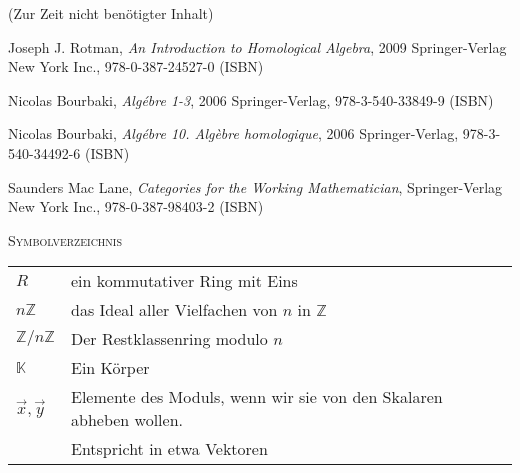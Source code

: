 \documentclass[a4paper]{amsart}
\theoremstyle{definition}
\newcommand{\Z}{\ensuremath{\mathbb{ Z }}}
\newcommand{\K}{\ensuremath{\mathbb{ K }}}
\newcommand{\zz}[1]{\ensuremath{\Z /#1\Z}}
\begin{document}
\begin{backup}
    (Zur Zeit nicht benötigter Inhalt)
\end{backup}

\begin{thebibliography}{9}
   	Joseph J. Rotman, \emph{An Introduction to Homological Algebra},
   	2009 Springer-Verlag New York Inc., 978-0-387-24527-0 (ISBN)

      Nicolas Bourbaki, \emph{Algébre 1-3},
      2006 Springer-Verlag, 978-3-540-33849-9 (ISBN)

      Nicolas Bourbaki, \emph{Algébre 10. Algèbre homologique},
      2006 Springer-Verlag, 978-3-540-34492-6 (ISBN)

      Saunders Mac Lane, \emph{Categories for the Working Mathematician},
      Springer-Verlag New York Inc., 978-0-387-98403-2 (ISBN)

\end{thebibliography}

\begin{large}
    \centerline{\textsc{Symbolverzeichnis}}
\end{large}
\bigskip

\renewcommand*{\arraystretch}{1}

\begin{tabular}{ll}
    $R$                                 & ein kommutativer Ring mit Eins\\
    $n\Z$                               & das Ideal aller Vielfachen von $n$ in $\Z$\\
    $\zz{n}$                            & Der Restklassenring modulo $n$\\
    $\K$                                & Ein Körper\\
    $\vec x, \vec y$                    & Elemente des Moduls, wenn wir sie von den Skalaren abheben wollen. \\& Entspricht in etwa Vektoren
\end{tabular}
\end{document}
